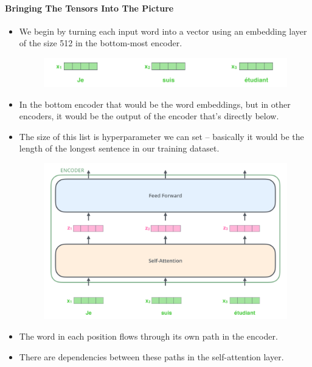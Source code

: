 \paragraph{Bringing The Tensors Into The Picture}
\begin{itemize}
\item We begin by turning each input word into a vector using an embedding layer  of the size 512 in the bottom-most encoder.
\begin{figure}[h]
        	\includegraphics[scale = 0.35]{pics/embeddings_enc.png}
        \end{figure}  


\item In the bottom encoder that would be the word embeddings, but in other encoders, it would be the output of the encoder that's directly below.

\item The size of this list is hyperparameter we can set – basically it would be the length of the longest sentence in our training dataset.


\begin{figure}[h]
        	\includegraphics[scale = 0.2]{pics/encoder_with_tensors.png}
        \end{figure}  

\item The word in each position flows through its own path in the encoder. 

\item There are dependencies between these paths in the self-attention layer. 


\end{itemize}
